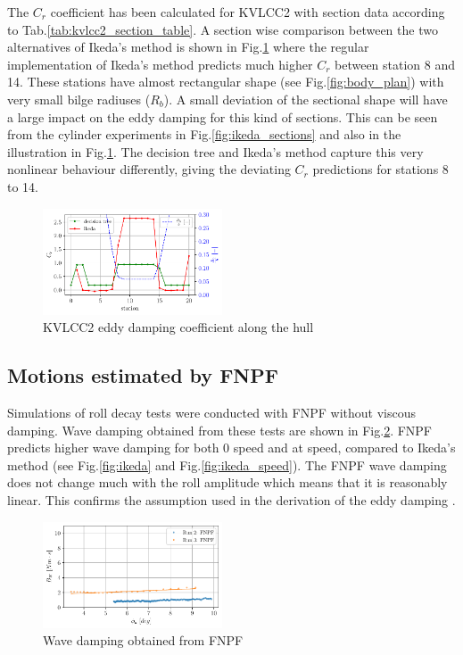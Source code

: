 The $C_r$ coefficient has been calculated for KVLCC2 with section data
according to Tab.\ref{tab:kvlcc2_section_table}. A section wise
comparison between the two alternatives of Ikeda's method is shown in
Fig.\ref{fig:kvlcc2_eddy} where the regular implementation of
Ikeda's method predicts much higher $C_r$ between station 8 and 14.
These stations have almost rectangular shape (see
Fig.\ref{fig:body_plan}) with very small bilge radiuses
($R_b$). A small deviation of the sectional shape will have a large
impact on the eddy damping for this kind of sections. This can be seen
from the cylinder experiments in Fig.\ref{fig:ikeda_sections}
and also in the illustration in Fig.\ref{fig:kvlcc2_eddy}. The
decision tree and Ikeda's method capture this very nonlinear behaviour
differently, giving the deviating $C_r$ predictions for stations 8 to
14.
\begin{figure}[H]
\begin{center}\includegraphics[width = 0.475\textwidth]{figures/kvlcc2_eddy.pdf}\end{center}
\vspace{-1cm}
\caption{KVLCC2 eddy damping coefficient along the hull}
\label{fig:kvlcc2_eddy}
\end{figure}
\subsection*{Motions estimated by FNPF}\label{motions-estimated-by-fnpf}
Simulations of roll decay tests were conducted with FNPF without viscous
damping. Wave damping obtained from these tests are shown in
Fig.\ref{fig:fnpf}. FNPF predicts higher wave damping for both 0
speed and at speed, compared to Ikeda's method (see
Fig.\ref{fig:ikeda} and Fig.\ref{fig:ikeda_speed}). The
FNPF wave damping does not change much with the roll amplitude which
means that it is reasonably linear. This confirms the assumption used in
the derivation of the eddy damping \citep{7505983/4AFVVGNT}.
\begin{figure}[H]
\begin{center}\includegraphics[width = 0.475\textwidth]{figures/fnpf.pdf}\end{center}
\vspace{-1cm}
\caption{Wave damping obtained from FNPF}
\label{fig:fnpf}
\end{figure}
